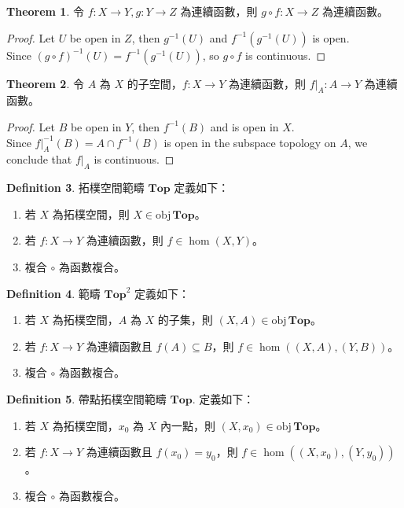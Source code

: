 \documentclass[12pt]{article}
\theoremstyle{definition}
\newtheorem{definition}{Definition}[section]
\newtheorem{theorem}[definition]{Theorem}
\newcommand\<{\langle}
\renewcommand\>{\rangle}
\newcommand\obj{\mathrm{obj}\hspace{2pt}}
\begin{document}
\begin{CJK}{UTF8}{bsmi}
\begin{theorem}
    令 $f:X\to Y, g:Y\to Z$ 為連續函數，則 $g\circ f:X\to Z$ 為連續函數。
\end{theorem}
\begin{proof}
    Let $U$ be open in $Z$, then $g^{-1}(U)$ and $f^{-1}(g^{-1}(U))$ is open. \\
    Since $(g\circ f)^{-1}(U)=f^{-1}(g^{-1}(U))$, so $g\circ f$ is continuous.
\end{proof}

\begin{theorem}
    令 $A$ 為 $X$ 的子空間，$f:X\to Y$ 為連續函數，則 $f|_A:A\to Y$ 為連續函數。
\end{theorem}
\begin{proof}
    Let $B$ be open in $Y$, then $f^{-1}(B)$ and is open in $X$. \\
    Since $f|_A^{-1}(B)=A\cap f^{-1}(B)$ is open in the subspace topology on $A$, we conclude that $f|_A$ is continuous.
\end{proof}

\begin{definition}
    拓樸空間範疇 $\textbf{Top}$ 定義如下：
    \begin{enumerate}
        \item 若 $X$ 為拓樸空間，則 $X\in\obj\textbf{Top}$。
        \item 若 $f:X\to Y$ 為連續函數，則 $f\in\hom(X, Y)$。
        \item 複合 $\circ$ 為函數複合。
    \end{enumerate}
\end{definition}

\begin{definition}
    範疇 $\textbf{Top}^2$ 定義如下：
    \begin{enumerate}
        \item 若 $X$ 為拓樸空間，$A$ 為 $X$ 的子集，則 $(X, A)\in\obj\textbf{Top}$。
        \item 若 $f:X\to Y$ 為連續函數且 $f(A)\subseteq B$，則 $f\in\hom((X, A), (Y, B))$。
        \item 複合 $\circ$ 為函數複合。
    \end{enumerate}
\end{definition}

\begin{definition}
    帶點拓樸空間範疇 $\textbf{Top.}$ 定義如下：
    \begin{enumerate}
        \item 若 $X$ 為拓樸空間，$x_0$ 為 $X$ 內一點，則 $(X, x_0)\in\obj\textbf{Top}$。
        \item 若 $f:X\to Y$ 為連續函數且 $f(x_0)=y_0$，則 $f\in\hom((X, x_0), (Y, y_0))$。
        \item 複合 $\circ$ 為函數複合。
    \end{enumerate}
\end{definition}


\end{CJK}
\end{document}
